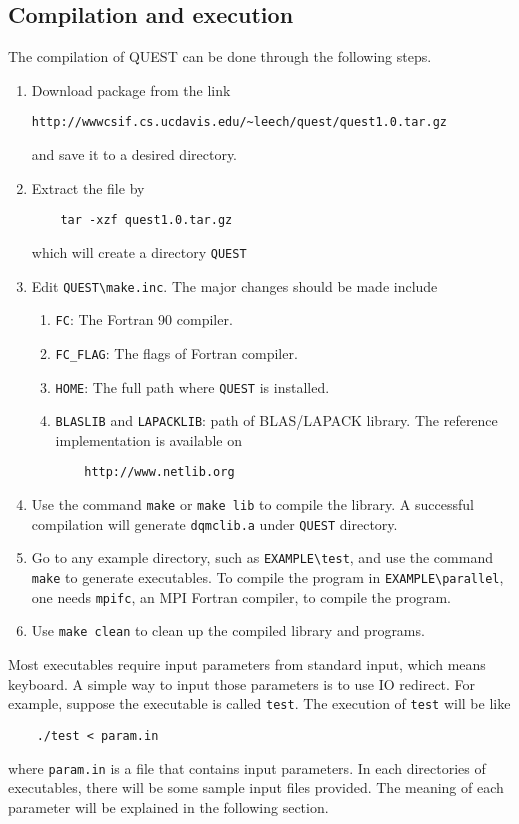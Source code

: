 \documentclass[12pt]{article}
\begin{document}
\subsection{Compilation and execution}
The compilation of QUEST can be done through the following steps.
\begin{enumerate}
  \item Download package from the link
\begin{verbatim}
http://wwwcsif.cs.ucdavis.edu/~leech/quest/quest1.0.tar.gz
\end{verbatim}
    and save it to a desired directory.
  \item Extract the file by
\begin{verbatim}
    tar -xzf quest1.0.tar.gz
\end{verbatim}
    which will create a directory \verb"QUEST"
  \item Edit \verb"QUEST\make.inc". The major changes should be made include
    \begin{enumerate}
      \item \verb"FC": The Fortran 90 compiler.
      \item \verb"FC_FLAG": The flags of Fortran compiler.
      \item \verb"HOME": The full path where \verb"QUEST" is installed.
      \item \verb"BLASLIB" and \verb"LAPACKLIB": path of BLAS/LAPACK library.
            The reference implementation is available on
\begin{verbatim}
    http://www.netlib.org
\end{verbatim}
    \end{enumerate}
    \item Use the command \verb"make" or \verb"make lib" to compile the library.
          A successful compilation will generate \verb"dqmclib.a" under \verb"QUEST" directory.
    \item Go to any example directory, such as \verb"EXAMPLE\test", and use the
          command \verb"make" to generate executables. To compile the program in \verb"EXAMPLE\parallel", one needs \verb"mpifc", an MPI Fortran compiler, to compile the program.
    \item Use \verb"make clean" to clean up the compiled library and programs.
\end{enumerate}

Most executables require input parameters from standard input, which means keyboard.
A simple way to input those parameters is to use IO redirect. For example, suppose the executable is called \verb"test". The execution of \verb"test" will be like
\begin{verbatim}
    ./test < param.in
\end{verbatim}
where \verb"param.in" is a file that contains input parameters.
In each directories of executables, there will be some sample input files provided.
The meaning of each parameter will be explained in the following section.
\end{document}
